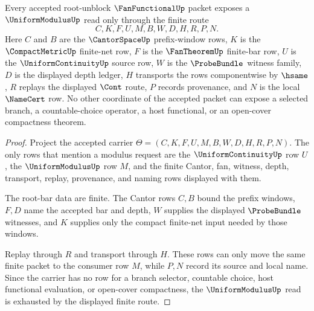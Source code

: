 \begin{theorem}
\label{thm:fanfunctional-root-finite-modulus-route}
Every accepted root-unblock $\FanFunctionalUp$ packet exposes a
$\UniformModulusUp$ read only through the finite route
$$
C,K,F,U,M,B,W,D,H,R,P,N.
$$
Here $C$ and $B$ are the $\CantorSpaceUp$ prefix-window rows, $K$ is the
$\CompactMetricUp$ finite-net row, $F$ is the $\FanTheoremUp$ finite-bar row,
$U$ is the $\UniformContinuityUp$ source row, $W$ is the $\ProbeBundle$
witness family, $D$ is the displayed depth ledger, $H$ transports the rows
componentwise by $\hsame$, $R$ replays the displayed $\Cont$ route, $P$
records provenance, and $N$ is the local $\NameCert$ row. No other coordinate
of the accepted packet can expose a selected branch, a countable-choice
operator, a host functional, or an open-cover compactness theorem.
\end{theorem}
\begin{proof}
Project the accepted carrier $\Theta=(C,K,F,U,M,B,W,D,H,R,P,N)$. The only
rows that mention a modulus request are the $\UniformContinuityUp$ row $U$,
the $\UniformModulusUp$ row $M$, and the finite Cantor, fan, witness,
depth, transport, replay, provenance, and naming rows displayed with them.

The root-bar data are finite. The Cantor rows $C,B$ bound the prefix windows,
$F,D$ name the accepted bar and depth, $W$ supplies the displayed
$\ProbeBundle$ witnesses, and $K$ supplies only the compact finite-net input
needed by those windows.

Replay through $R$ and transport through $H$. These rows can only move the
same finite packet to the consumer row $M$, while $P,N$ record its source and
local name. Since the carrier has no row for a branch selector, countable
choice, host functional evaluation, or open-cover compactness, the
$\UniformModulusUp$ read is exhausted by the displayed finite route.
\end{proof}

